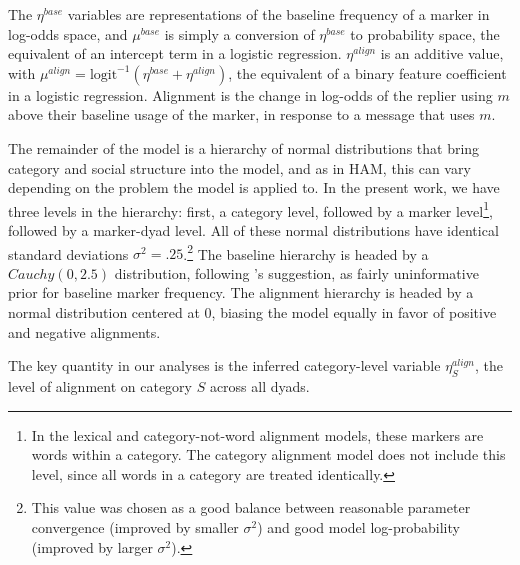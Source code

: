 \documentclass[11pt]{article}
\begin{document}
The $\eta^{base}$ variables are representations of the baseline frequency of a marker in log-odds space, and $\mu^{base}$ is simply a conversion of $\eta^{base}$ to probability space, the equivalent of an intercept term in a logistic regression. $\eta^{align}$ is an additive value, with $\mu^{align} = \textrm{logit}^{-1}(\eta^{base}+\eta^{align})$, the equivalent of a binary feature coefficient in a logistic regression.  Alignment is the change in log-odds of the replier using $m$ above their baseline usage of the marker, in response to a message that uses $m$.

The remainder of the model is a hierarchy of normal distributions that bring category and social structure into the model, and as in HAM, this can vary depending on the problem the model is applied to.  In the present work, we have three levels in the hierarchy: first, a category level, followed by a marker level\footnote{In the lexical and category-not-word alignment models, these markers are words within a category. The category alignment model does not include this level, since all words in a category are treated identically.}, followed by a marker-dyad level. All of these normal distributions have identical standard deviations $\sigma^2=.25$.\footnote{This value was chosen as a good balance between reasonable parameter convergence (improved by smaller $\sigma^2$) and good model log-probability (improved by larger $\sigma^2$).}  The baseline hierarchy is headed by a $Cauchy(0,2.5)$ distribution, following \cite{GelmanEtAl2008}'s suggestion, as fairly uninformative prior for baseline marker frequency. The alignment hierarchy is headed by a normal distribution centered at 0, biasing the model equally in favor of positive and negative alignments.

The key quantity in our analyses is the inferred category-level variable $\eta^{align}_{S}$, the level of alignment on category $S$ across all dyads.

\end{document}
